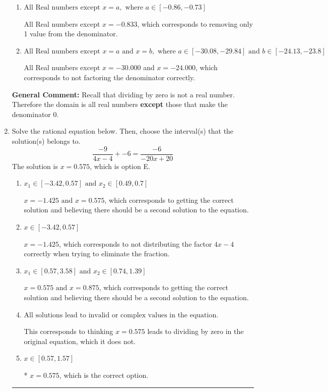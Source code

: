 \documentclass{extbook}[14pt]
\newcommand{\litem}[1]{\item #1

\rule{\textwidth}{0.4pt}}
\begin{document}
\begin{enumerate}
{\begin{enumerate}[label=\Alph*.]
All Real numbers except $x = -0.833$ and $x = -0.667$, which is the correct option.
\item \( \text{All Real numbers except } x = a, \text{ where } a \in [-0.86, -0.73] \)

All Real numbers except $x = -0.833$, which corresponds to removing only 1 value from the denominator.
\item \( \text{All Real numbers except } x = a \text{ and } x = b, \text{ where } a \in [-30.08, -29.84] \text{ and } b \in [-24.13, -23.8] \)

All Real numbers except $x = -30.000$ and $x = -24.000$, which corresponds to not factoring the denominator correctly.
\end{enumerate}

\textbf{General Comment:} Recall that dividing by zero is not a real number. Therefore the domain is all real numbers \textbf{except} those that make the denominator 0.
}
\litem{
Solve the rational equation below. Then, choose the interval(s) that the solution(s) belongs to.
\[ \frac{-9}{4x -4} + -6 = \frac{-6}{-20x + 20} \]The solution is \( x = 0.575 \), which is option E.\begin{enumerate}[label=\Alph*.]
\item \( x_1 \in [-3.42, 0.57] \text{ and } x_2 \in [0.49,0.7] \)

$x = -1.425 \text{ and } x = 0.575$, which corresponds to getting the correct solution and believing there should be a second solution to the equation.
\item \( x \in [-3.42,0.57] \)

$x = -1.425$, which corresponds to not distributing the factor $4x -4$ correctly when trying to eliminate the fraction.
\item \( x_1 \in [0.57, 3.58] \text{ and } x_2 \in [0.74,1.39] \)

$x = 0.575 \text{ and } x = 0.875$, which corresponds to getting the correct solution and believing there should be a second solution to the equation.
\item \( \text{All solutions lead to invalid or complex values in the equation.} \)

This corresponds to thinking $x = 0.575$ leads to dividing by zero in the original equation, which it does not.
\item \( x \in [0.57,1.57] \)

* $x = 0.575$, which is the correct option.
\end{enumerate}

}
\end{enumerate}
\end{document}

